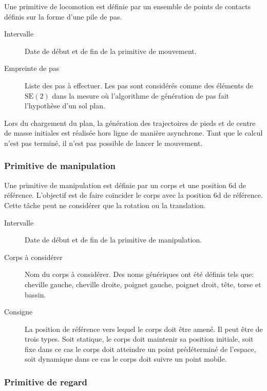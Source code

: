 Une primitive de locomotion est définie par un ensemble de points de
contacts définis sur la forme d'une pile de pas.

\begin{description}
\item[Intervalle] Date de début et de fin de la primitive de mouvement.
\item[Empreinte de pas] Liste des pas à effectuer. Les pas sont
  considérés comme des éléments de $\text{SE}(2)$ dans la mesure où
  l'algorithme de génération de pas fait l'hypothèse d'un sol plan.
\end{description}

Lors du chargement du plan, la génération des trajectoires de pieds et
de centre de masse initiales est réalisée hors ligne de manière
asynchrone. Tant que le calcul n'est pas terminé, il n'est pas
possible de lancer le mouvement.


\subsubsection{Primitive de manipulation}

Une primitive de manipulation est définie par un corps et une position
6d de référence. L'objectif est de faire coïncider le corps avec la
position 6d de référence. Cette tâche peut ne considérer que la
rotation ou la translation.

\begin{description}
\item[Intervalle] Date de début et de fin de la primitive de manipulation.
\item[Corps à considérer] Nom du corps à considérer. Des noms
  génériques ont été définis tels que: cheville gauche, cheville
  droite, poignet gauche, poignet droit, tête, torse et bassin.
\item[Consigne] La position de référence vers lequel le corps doit
  être amené. Il peut être de trois types. Soit statique, le corps
  doit maintenir sa position initiale, soit fixe dans ce cas le corps
  doit atteindre un point prédéterminé de l'espace, soit dynamique
  dans ce cas le corps doit suivre un point mobile.
\end{description}


\subsubsection{Primitive de regard}

